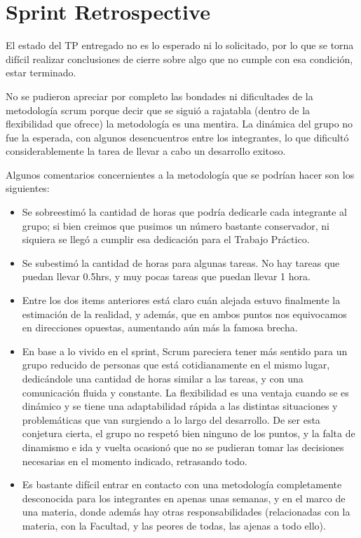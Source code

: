 \section{Sprint Retrospective}
El estado del TP entregado no es lo esperado ni lo solicitado, por lo que se torna difícil realizar conclusiones de cierre sobre algo que no cumple con esa condición, estar terminado. 

No se pudieron apreciar por completo las bondades ni dificultades de la metodología scrum porque decir que se siguió a rajatabla (dentro de la flexibilidad que ofrece) la metodología es una mentira. La dinámica del grupo no fue la esperada, con algunos desencuentros entre los integrantes, lo que dificultó considerablemente la tarea de llevar a cabo un desarrollo exitoso.

Algunos comentarios concernientes a la metodología que se podrían hacer son los siguientes:
\begin{itemize}
 \item Se sobreestimó la cantidad de horas que podría dedicarle cada integrante al grupo; si bien creimos que pusimos un número bastante conservador, ni siquiera se llegó a cumplir esa dedicación para el Trabajo Práctico. 
 \item Se subestimó la cantidad de horas para algunas tareas. No hay tareas que puedan llevar 0.5hrs, y muy pocas tareas que puedan llevar 1 hora. 
 \item Entre los dos items anteriores está claro cuán alejada estuvo finalmente la estimación de la realidad, y además, que en ambos puntos nos equivocamos en direcciones opuestas, aumentando aún más la famosa brecha.
 \item En base a lo vivido en el sprint, Scrum pareciera tener más sentido para un grupo reducido de personas que está cotidianamente en el mismo lugar, dedicándole una cantidad de horas similar a las tareas, y con una comunicación fluida y constante. La flexibilidad es una ventaja cuando se es dinámico y se tiene una adaptabilidad rápida a las distintas situaciones y problemáticas que van surgiendo a lo largo del desarrollo. De ser esta conjetura cierta, el grupo no respetó bien ninguno de los puntos, y la falta de dinamismo e ida y vuelta ocasionó que no se pudieran tomar las decisiones necesarias en el momento indicado, retrasando todo.
 \item Es bastante difícil entrar en contacto con una metodología completamente desconocida para los integrantes en apenas unas semanas, y en el marco de una materia, donde además hay otras responsabilidades (relacionadas con la materia, con la Facultad, y las peores de todas, las ajenas a todo ello).
\end{itemize}


